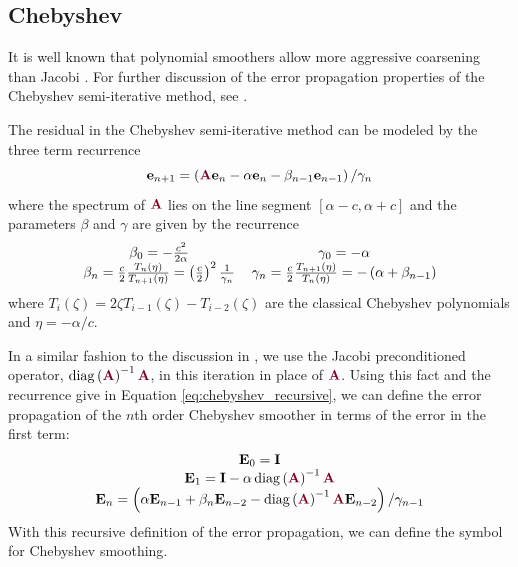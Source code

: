 \subsection{Chebyshev}

It is well known that polynomial smoothers allow more aggressive coarsening than Jacobi \cite{brannick2015polynomial}.
For further discussion of the error propagation properties of the Chebyshev semi-iterative method, see \cite{gutknecht2002revisited}.

The residual in the Chebyshev semi-iterative method can be modeled by the three term recurrence
\begin{equation}
\mathbf{e}_{n + 1} = \left( {\color{burgundy}\mathbf{A}} \mathbf{e}_n - \alpha \mathbf{e}_n - \beta_{n - 1} \mathbf{e}_{n - 1} \right) / \gamma_n
\label{eq:chebyshev_recursive}
\end{equation}
where the spectrum of ${\color{burgundy}\mathbf{A}}$ lies on the line segment $\left[ \alpha - c, \alpha + c \right]$ and the parameters $\beta$ and $\gamma$ are given by the recurrence
\begin{equation}
\begin{tabular}{c c}
$\beta_0 = - \frac{c^2}{2 \alpha}$ & $\gamma_0 = - \alpha$\\
$\beta_n = \frac{c}{2} \frac{T_n \left( \eta \right)}{T_{n + 1} \left( \eta \right)} = \left( \frac{c}{2} \right)^2 \frac{1}{\gamma_n}$ & $\gamma_n = \frac{c}{2} \frac{T_{n + 1} \left( \eta \right)}{T_n \left( \eta \right)} = - \left( \alpha + \beta_{n - 1} \right)$
\end{tabular}
\end{equation}
where $T_i \left( \zeta \right) = 2 \zeta T_{i - 1} \left( \zeta \right) - T_{i - 2} \left( \zeta \right)$ are the classical Chebyshev polynomials and $\eta = - \alpha / c$.

In a similar fashion to the discussion in \cite{adams2003parallel}, we use the Jacobi preconditioned operator, $\diag \left({\color{burgundy}\mathbf{A}}\right)^{-1} {\color{burgundy}\mathbf{A}}$, in this iteration in place of ${\color{burgundy}\mathbf{A}}$.
Using this fact and the recurrence give in Equation \ref{eq:chebyshev_recursive}, we can define the error propagation of the $n$th order Chebyshev smoother in terms of the error in the first term:
\begin{equation}
\begin{tabular}{c}
$\mathbf{E}_0 = \mathbf{I}$\\
$\mathbf{E}_1 = \mathbf{I} - \alpha \diag \left( {\color{burgundy}\mathbf{A}} \right)^{-1} {\color{burgundy}\mathbf{A}}$\\
$\mathbf{E}_n = \left( \alpha \mathbf{E}_{n - 1} + \beta_n \mathbf{E}_{n - 2} - \diag \left( {\color{burgundy}\mathbf{A}} \right)^{-1} {\color{burgundy}\mathbf{A}} \mathbf{E}_{n - 2} \right) / \gamma_{n - 1}$
\end{tabular}
\label{eq:chebyshev_error_propagation}
\end{equation}
With this recursive definition of the error propagation, we can define the symbol for Chebyshev smoothing.


